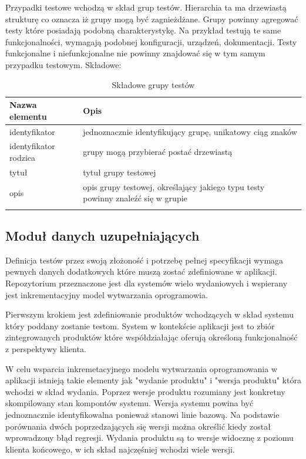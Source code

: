 Przypadki testowe wchodzą w skład grup testów. Hierarchia ta ma drzewiastą strukturę co oznacza iż grupy mogą być zagnieżdżane. Grupy powinny agregować testy które posiadają podobną charakterystykę. Na przykład testują te same funkcjonalności, wymagają podobnej konfiguracji, urządzeń, dokumentacji. Testy funkcjonalne i niefunkcjonalne nie powinny znajdować się w tym samym przypadku testowym. Składowe:

\begin{longtable}{| p{6cm}  | p{10cm} |}
 \hline \hline
\textbf{Nazwa elementu} & \textbf{Opis}  \\ \hline
  identyfikator & jednoznacznie identyfikujący grupę, unikatowy ciąg znaków \\ \hline
  identyfikator rodzica & grupy mogą przybierać postać drzewiastą \\ \hline
  tytuł & tytuł grupy testowej \\ \hline
  opis & opis grupy testowej, określający jakiego typu testy powinny znaleźć się w grupie \\ \hline
 \caption{ Składowe grupy testów}
\end{longtable}


\subsection{Moduł danych uzupełniających}

Definicja testów przez swoją złożoność i potrzebę pełnej specyfikacji wymaga pewnych danych dodatkowych które muszą zostać zdefiniowane w aplikacji. Repozytorium przeznaczone jest dla systemów wielo wydaniowych i wspierany jest inkrementacyjny model wytwarzania oprogramowia.

Pierwszym krokiem jest zdefiniowanie produktów wchodzących w skład systemu który poddany zostanie testom. System w kontekście aplikacji jest to zbiór zintegrowanych produktów które współdziałając oferują określoną funkcjonalność z perspektywy klienta.

W celu wsparcia inkremetacyjnego modelu wytwarzania oprogramowania w aplikacji istnieją takie elementy jak "wydanie produktu" i "wersja produktu" która wchodzi w skład wydania. Poprzez wersje produktu rozumiany jest konkretny skompilowany stan kompontów systemu. Wersja systemu powina być jednoznacznie identyfikowalna ponieważ stanowi linie bazową. Na podstawie porównania dwóch poprzedzających się wersji można określić kiedy został wprowadzony błąd regresji. Wydania produktu są to wersje widocznę z poziomu klienta końcowego, w ich skład najczęśniej wchodzi wiele wersji.


